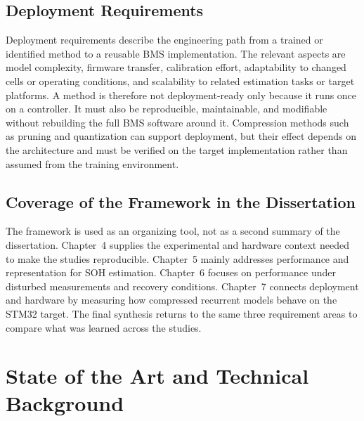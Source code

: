 \documentclass[
    a4paper,
    12pt,
    titlepage,
    bibliography=totoc,
    twoside=on,
    parskip=false,
    numbers=noenddot,
    cleardoublepage=empty,
    DIV=12,
    BCOR=12.0mm,
    headheight=36pt,
    headings=openright
]{scrreprt}
\begin{document}
\section{Deployment Requirements}
Deployment requirements describe the engineering path from a trained or identified method to a reusable BMS implementation. The relevant aspects are model complexity, firmware transfer, calibration effort, adaptability to changed cells or operating conditions, and scalability to related estimation tasks or target platforms. A method is therefore not deployment-ready only because it runs once on a controller. It must also be reproducible, maintainable, and modifiable without rebuilding the full BMS software around it. Compression methods such as pruning and quantization can support deployment, but their effect depends on the architecture and must be verified on the target implementation rather than assumed from the training environment.\autocite{hanLearningBothWeights2015,jacobQuantizationTrainingNeural2017}

\section{Coverage of the Framework in the Dissertation}
The framework is used as an organizing tool, not as a second summary of the dissertation. Chapter~4 supplies the experimental and hardware context needed to make the studies reproducible. Chapter~5 mainly addresses performance and representation for SOH estimation. Chapter~6 focuses on performance under disturbed measurements and recovery conditions. Chapter~7 connects deployment and hardware by measuring how compressed recurrent models behave on the STM32 target. The final synthesis returns to the same three requirement areas to compare what was learned across the studies.

\chapter{State of the Art and Technical Background}
\end{document}
